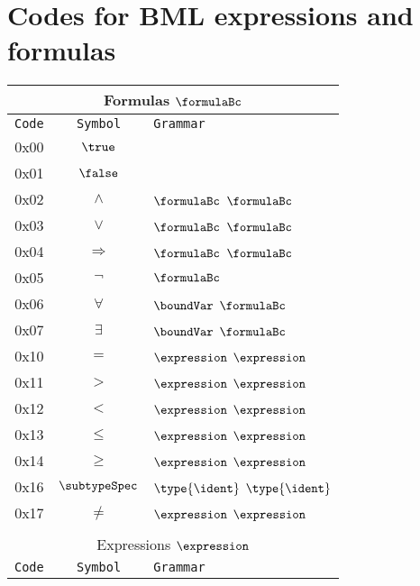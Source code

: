 \section{Codes for BML expressions and formulas}
\begin{center}
\begin{tabular}[t]{|c|c|l|}
\hline
\multicolumn{3}{|c|}{Formulas $\formulaBc $  } \\ 
\hline
\texttt{Code}&\texttt{Symbol}&\texttt{Grammar}\\
\hline
0x00 & $\true$  & \\
0x01 & $\false$ &\\
0x02 & $\wedge$ & $\formulaBc$ $\formulaBc$ \\
0x03 & $\vee$ & $\formulaBc$ $\formulaBc$ \\
0x04 & $\Rightarrow$ & $\formulaBc$ $\formulaBc$ \\
0x05 & $\neg$ & $\formulaBc$\\
0x06 & $\forall$ &  $ \boundVar$ $\formulaBc$ \\
0x07 & $\exists$ &  $ \boundVar$ $\formulaBc$ \\
0x10 & $= $ & $\expression$ $\expression$ \\
0x11 & $>  $ & $\expression$ $\expression$ \\
0x12 & $< $ & $\expression$ $\expression$ \\
0x13 & $\le $ & $\expression$ $\expression$ \\
0x14 & $\ge$ & $\expression$ $\expression$ \\
0x16 & $\subtypeSpec$ & $\type{\ident}$  $\type{\ident}$  \\
0x17 & $\neq$ & $\expression$ $\expression$ \\ 
& & \\
\hline
\multicolumn{3}{|c|}{Expressions $\expression$ } \\ 
\hline
\texttt{Code}&\texttt{Symbol}&\texttt{Grammar}\\
\hline


\end{tabular}
\end{center}
